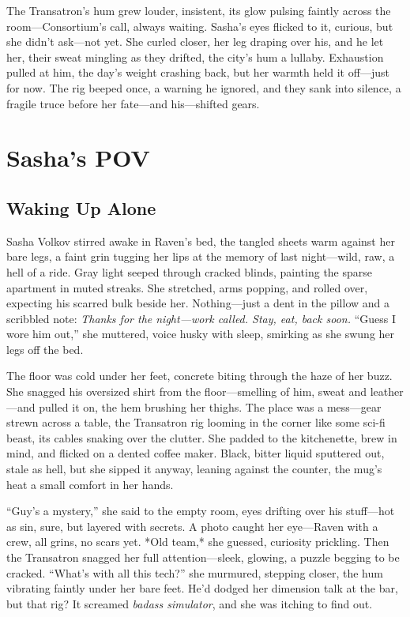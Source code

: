 \documentclass[12pt]{book}
\begin{document}
The Transatron’s hum grew louder, insistent, its glow pulsing faintly across the room—Consortium’s call, always waiting. Sasha’s eyes flicked to it, curious, but she didn’t ask—not yet. She curled closer, her leg draping over his, and he let her, their sweat mingling as they drifted, the city’s hum a lullaby. Exhaustion pulled at him, the day’s weight crashing back, but her warmth held it off—just for now. The rig beeped once, a warning he ignored, and they sank into silence, a fragile truce before her fate—and his—shifted gears.

\chapter{Sasha’s POV}

\section{Waking Up Alone}

Sasha Volkov stirred awake in Raven’s bed, the tangled sheets warm against her bare legs, a faint grin tugging her lips at the memory of last night—wild, raw, a hell of a ride. Gray light seeped through cracked blinds, painting the sparse apartment in muted streaks. She stretched, arms popping, and rolled over, expecting his scarred bulk beside her. Nothing—just a dent in the pillow and a scribbled note: \textit{Thanks for the night—work called. Stay, eat, back soon.} “Guess I wore him out,” she muttered, voice husky with sleep, smirking as she swung her legs off the bed.

The floor was cold under her feet, concrete biting through the haze of her buzz. She snagged his oversized shirt from the floor—smelling of him, sweat and leather—and pulled it on, the hem brushing her thighs. The place was a mess—gear strewn across a table, the Transatron rig looming in the corner like some sci-fi beast, its cables snaking over the clutter. She padded to the kitchenette, brew in mind, and flicked on a dented coffee maker. Black, bitter liquid sputtered out, stale as hell, but she sipped it anyway, leaning against the counter, the mug’s heat a small comfort in her hands.

“Guy’s a mystery,” she said to the empty room, eyes drifting over his stuff—hot as sin, sure, but layered with secrets. A photo caught her eye—Raven with a crew, all grins, no scars yet. *Old team,* she guessed, curiosity prickling. Then the Transatron snagged her full attention—sleek, glowing, a puzzle begging to be cracked. “What’s with all this tech?” she murmured, stepping closer, the hum vibrating faintly under her bare feet. He’d dodged her dimension talk at the bar, but that rig? It screamed \textit{badass simulator}, and she was itching to find out.
\end{document}
